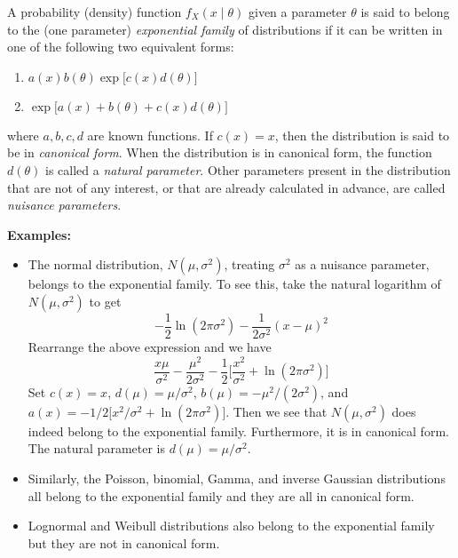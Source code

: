 \documentclass[12pt]{article}
\begin{document}
A probability (density) function $f_X(x\mid\theta)$ given a parameter $\theta$ is said to belong to the (one parameter) \emph{exponential family} of distributions if it can be written in one of the following two equivalent forms:
\begin{enumerate}
\item $a(x)b(\theta)\operatorname{exp}\big[ c(x)d(\theta)\big ]$
\item $\operatorname{exp}\big[ a(x)+b(\theta)+c(x)d(\theta) \big]$
\end{enumerate}
where $a,b,c,d$ are known functions. 
If $c(x)=x$, then the distribution is said to be in \emph{canonical form}.  When the distribution is in canonical form, the function $d(\theta)$ is called a \emph{natural parameter}.  Other parameters present in the distribution that are not of any interest, or that are already calculated in advance, are called \emph{nuisance parameters}.

\textbf{Examples:}
\begin{itemize}
\item The normal distribution, $N(\mu,\sigma^2)$, treating $\sigma^2$ as a nuisance parameter, belongs to the exponential family.  To see this, take the natural logarithm of $N(\mu,\sigma^2)$ to get 
$$-\frac{1}{2}\operatorname{ln}(2\pi\sigma^2)-\frac{1}{2\sigma^2}(x-\mu)^2$$
Rearrange the above expression and we have
$$\frac{x\mu}{\sigma^2}-\frac{\mu^2}{2\sigma^2}-\frac{1}{2}\Big[\frac{x^2}{\sigma^2}+\operatorname{ln}(2\pi\sigma^2)\Big]$$
Set $c(x)=x$, $d(\mu)=\mu/\sigma^2$, $b(\mu)=-\mu^2/(2\sigma^2)$, and 
$a(x)=-1/2\big[x^2/\sigma^2+\operatorname{ln}(2\pi\sigma^2)\big]$.  Then we see that $N(\mu,\sigma^2)$ does indeed belong to the exponential family.  Furthermore, it is in canonical form.  The natural parameter is $d(\mu)=\mu/\sigma^2$.
\item Similarly, the Poisson, binomial, Gamma, and inverse Gaussian distributions all belong to the exponential family and they are all in canonical form.
\item Lognormal and Weibull distributions also belong to the exponential family but they are not in canonical form.
\end{itemize}
\end{document}
